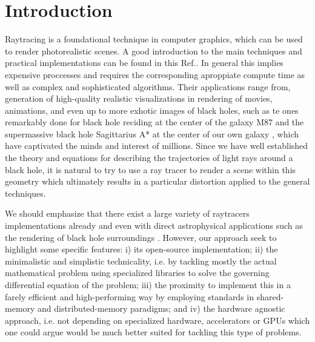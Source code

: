 


\section{Introduction}
\label{sec:intro}



Raytracing is a foundational technique in computer graphics, which can be used
to render photorealistic scenes.
A good introduction to the main techniques and practical implementations can be found
in this Ref.\cite{raytracing_in_one_weekend}.
In general this implies expensive proccesses and requires the corresponding aproppiate compute time
as well as complex and sophisticated algorithms.
Their applications range from, generation of high-quality realistic visualizations
in rendering of movies, animations, and even up to more exhotic images of black holes,
such as te ones remarkably done for black hole reciding at the center of the galaxy M87 \cite{M87_EHT_i}
and the supermassive black hole Sagittarius A* at the center of our own galaxy \cite{SagA_EHT_i},
which have captivated the minds and interest of millions.
Since we have well established the theory and equations for describing the trajectories of light rays around a black hole, it is natural to try to use a ray tracer to render a scene within this geometry which ultimately results in a particular distortion applied to the general techniques.

We should emphasize that there exist a large variety of raytracers implementations already 
\cite{imbens2023graphicalprocessinggeodesicpropagation,10.2312/EGPGV/EGPGV12/051-060,7539599_OSPRay}
and even with direct astrophysical applications such as the rendering of black hole surroundings
\cite{10.2312:vmv.20221208,sharma2023mahakalapythonbasedmodularraytracing,James_2015}.
However, our approach seek to highlight some specific features:
i) its open-source implementation;
ii) the minimalistic and simplistic technicality, i.e. by tackling
mostly the actual mathematical problem using specialized libraries
to solve the governing differential equation of the problem;
iii) the proximity to implement this in a farely efficient and high-performing
way by employing standards in shared-memory and distributed-memory paradigms;
and iv) the hardware agnostic approach, i.e. not depending on specialized hardware, accelerators or GPUs which one could argue would be much better suited for tackling this type of problems.


